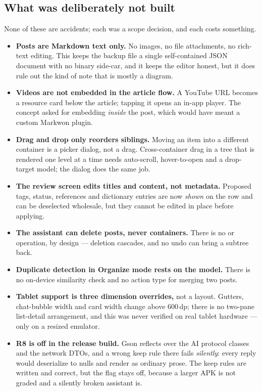 \subsection{What was deliberately not built}

None of these are accidents; each was a scope decision, and each costs something.

\begin{itemize}
  \item \textbf{Posts are Markdown text only.} No images, no file attachments, no rich-text editing.
        This keeps the backup file a single self-contained JSON document with no binary side-car, and
        it keeps the editor honest, but it does rule out the kind of note that is mostly a diagram.
  \item \textbf{Videos are not embedded in the article flow.} A YouTube URL becomes a resource card
        below the article; tapping it opens an in-app player. The concept asked for embedding
        \emph{inside} the post, which would have meant a custom Markwon plugin.
  \item \textbf{Drag and drop only reorders siblings.} Moving an item into a different container is a
        picker dialog, not a drag. Cross-container drag in a tree that is rendered one level at a time
        needs auto-scroll, hover-to-open and a drop-target model; the dialog does the same job.
  \item \textbf{The review screen edits titles and content, not metadata.} Proposed tags, status,
        references and dictionary entries are now \emph{shown} on the row and can be deselected
        wholesale, but they cannot be edited in place before applying.
  \item \textbf{The assistant can delete posts, never containers.} There is no
         or  operation, by design --- deletion cascades, and
        no undo can bring a subtree back.
  \item \textbf{Duplicate detection in Organize mode rests on the model.} There is no on-device
        similarity check and no action type for merging two posts.
  \item \textbf{Tablet support is three dimension overrides,} not a layout. Gutters, chat-bubble width
        and card width change above 600\,dp; there is no two-pane list-detail arrangement, and this
        was never verified on real tablet hardware --- only on a resized emulator.
  \item \textbf{R8 is off in the release build.} Gson reflects over the AI protocol classes and the
        network DTOs, and a wrong keep rule there fails \emph{silently}: every reply would deserialize
        to nulls and render as ordinary prose. The keep rules are written and correct, but the flag
        stays off, because a larger APK is not graded and a silently broken assistant is.
\end{itemize}

